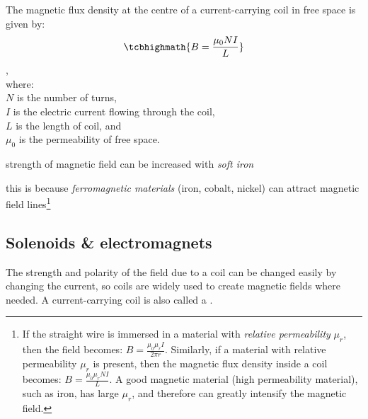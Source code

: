 The magnetic flux density at the centre of a current-carrying coil in free space is given by: $$\tcbhighmath{B=\frac{\mu_0 NI}{L}}$$, \\
where:\\
$N$ is the number of turns,\\
$I$ is the electric current flowing through the coil, \\
$L$ is the length of coil, and \\
$\mu_0$ is the permeability of free space.
 
 
\cmt strength of magnetic field can be increased with \emph{soft iron}

this is because \emph{ferromagnetic materials} (iron, cobalt, nickel) can attract magnetic field lines\footnote{If the straight wire is immersed in a material with \emph{relative permeability} $\mu_r$, then the field becomes: $B=\frac{\mu_0 \mu_r I}{2\pi r}$. Similarly, if a material with relative permeability $\mu_r$ is present, then the magnetic flux density inside a coil becomes: $B=\frac{\mu_0 \mu_r NI}{L}$. A good magnetic material (high permeability material), such as iron, has large $\mu_r$, and therefore can greatly intensify the magnetic field. \piste}

\subsection{Solenoids \& electromagnets}

The strength and polarity of the field due to a coil can be changed easily by changing the current, so coils are widely used to create magnetic fields where needed. A current-carrying coil is also called a .

